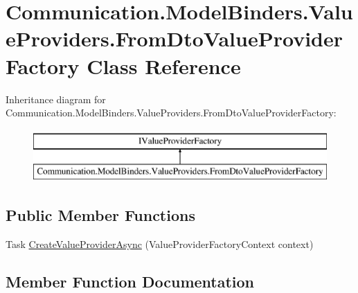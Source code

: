 \hypertarget{class_communication_1_1_model_binders_1_1_value_providers_1_1_from_dto_value_provider_factory}{}\section{Communication.\+Model\+Binders.\+Value\+Providers.\+From\+Dto\+Value\+Provider\+Factory Class Reference}
\label{class_communication_1_1_model_binders_1_1_value_providers_1_1_from_dto_value_provider_factory}
Inheritance diagram for Communication.\+Model\+Binders.\+Value\+Providers.\+From\+Dto\+Value\+Provider\+Factory\+:\begin{figure}[H]
\begin{center}
\leavevmode
\includegraphics[height=2.000000cm]{class_communication_1_1_model_binders_1_1_value_providers_1_1_from_dto_value_provider_factory}
\end{center}
\end{figure}
\subsection*{Public Member Functions}
\begin{DoxyCompactItemize}
\item 
Task \mbox{\hyperlink{class_communication_1_1_model_binders_1_1_value_providers_1_1_from_dto_value_provider_factory_a66a99cb8b4e1b5a91f8dbe8c50f32fba}{Create\+Value\+Provider\+Async}} (Value\+Provider\+Factory\+Context context)
\end{DoxyCompactItemize}


\subsection{Member Function Documentation}
\mbox{\label{class_communication_1_1_model_binders_1_1_value_providers_1_1_from_dto_value_provider_factory_a66a99cb8b4e1b5a91f8dbe8c50f32fba}} 
